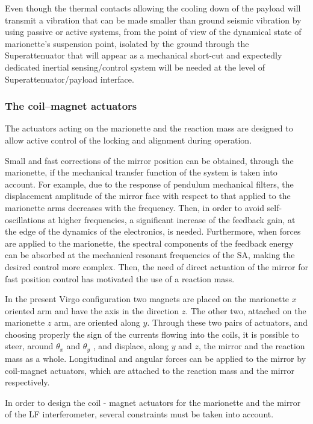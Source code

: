 Even though the thermal contacts allowing the cooling down of the payload will transmit a vibration that can be made smaller than ground seismic vibration by using passive or active systems, from the point of view of the dynamical state of marionette's suspension point, isolated by the ground through the Superattenuator that will appear as a mechanical short-cut and expectedly dedicated inertial sensing/control system will be needed at the level of Superattenuator/payload interface.

\FloatBarrier
\subsubsection{The  coil--magnet actuators}
\label{sec:em_actuator}

The actuators acting on the marionette and the reaction mass are designed to allow active control of the locking and alignment during operation.

Small and fast corrections of the mirror position can be obtained, through the marionette, if the mechanical transfer function of the system is taken into account. For example, due to the response of pendulum mechanical filters, the displacement amplitude of the mirror face with respect to that applied to the marionette arms decreases with the frequency. Then, in order to avoid self-oscillations at higher frequencies, a significant increase of the feedback gain, at the edge of the dynamics of the electronics, is needed. Furthermore, when forces are applied to the marionette, the spectral components of the feedback energy can be absorbed at the mechanical resonant frequencies of the SA, making the desired control more complex. Then, the need of direct actuation of the mirror for fast position control has motivated the use of a reaction mass.

In the present Virgo configuration two  magnets are placed on the marionette $x$ oriented arm and have the axis in the direction $z$. The other two, attached on the marionette $z$ arm, are oriented along $y$. Through these two pairs of actuators, and choosing properly the sign of the currents flowing into the coils, it is possible to steer, around $\theta_x$ and $\theta_y$ , and displace, along $y$ and $z$, the mirror and the reaction mass as a whole.
Longitudinal and angular forces can be applied to the mirror by coil-magnet actuators, which are attached to the reaction mass and the mirror respectively.

In order to design the coil - magnet actuators for the marionette and the mirror of the LF interferometer, several constraints must be taken into account.

